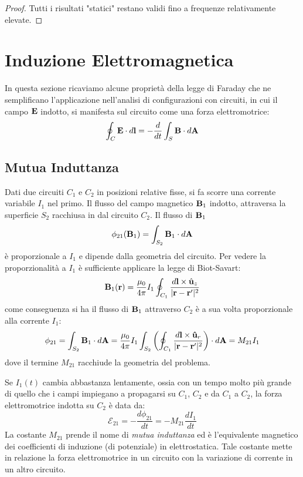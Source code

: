 \begin{proof}
Tutti i risultati "statici" restano validi fino a frequenze relativamente elevate.
 
 \end{proof}

\section{Induzione Elettromagnetica }

In questa sezione  ricaviamo alcune propriet\`a della legge di Faraday che ne semplificano l'applicazione nell'analisi di configurazioni con circuiti, in cui il campo $\bold{E}$ indotto, si manifesta sul circuito come una forza elettromotrice:
\begin{equation*}
	\oint_{C} \bold{E} \cdot d \bold{l} = - \frac{d}{dt} \int_{S} \bold{B} \cdot d \bold{A}
\end{equation*}
 
 \subsection{Mutua Induttanza}
 
 Dati due circuiti $C_1$ e $C_2$ in posizioni relative fisse, si fa scorre una corrente variabile $I_1 $ nel primo. Il flusso del campo magnetico $\bold{B}_1$ indotto, attraversa la superficie $S_2$ racchiusa in dal circuito $C_2$. Il flusso di $\bold{B}_1$
 \begin{equation*}
 	\phi_{21} (\bold{B}_1) = \int_{S_2}\bold{B}_1 \cdot d\bold{A} 
 \end{equation*}
 \`e proporzionale a $I_1$ e dipende dalla geometria del circuito. Per vedere la proporzionalit\`a a $I_1$ \`e sufficiente applicare la legge di Biot-Savart:
 \begin{equation*}
 	\bold{B}_1(\bold{r}) = \frac{\mu_0}{4 \pi}I_1 \oint_{C_1} \frac{d\bold{l} \times \hat{\bold{u}}_z}{|\bold{r} - \bold{r}'|^2}
 \end{equation*}
come conseguenza si ha il flusso di $\bold{B}_1$ attraverso $C_2$ \`e a sua volta proporzionale alla corrente $I_1$:
\begin{equation*}
	\phi_{21}  = \int_{S_2}\bold{B}_1 \cdot d \bold{A} = \frac{\mu_0}{4 \pi}I_1 \int_{S_2} \left(\oint_{C_1} \frac{d \bold{l} \times \bold{\hat{u}}_r}{|\bold{r} - \bold{r}'|^2}\right) \cdot d \bold{A} = M_{21}I_1
\end{equation*}
dove il termine $M_{21}$ racchiude la geometria del problema.

Se $I_1(t)$ cambia abbastanza lentamente, ossia con un tempo molto pi\`u grande di quello che i campi impiegano a propagarsi su $C_1$, $C_2$ e da $C_1$ a $C_2$, la forza elettromotrice indotta su $C_2$ \`e data da:
\begin{equation}
	\mathcal{E}_{21} = - \frac{d\phi_{21}}{dt} = -M_{21} \frac{dI_1}{dt}
\end{equation}
La costante $M_{21}$ prende il nome di \textit{mutua induttanza} ed \`e l'equivalente magnetico dei coefficienti di induzione (di potenziale) in elettrostatica. Tale costante mette in relazione la forza elettromotrice in un circuito con la variazione di corrente in un altro circuito.
\newline

